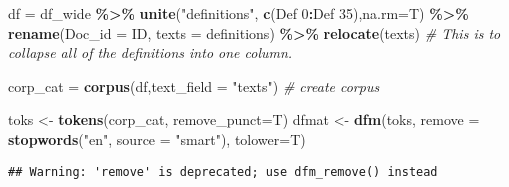 \documentclass[
]{article}
\newenvironment{Shaded}{\begin{snugshade}}{\end{snugshade}}
\newcommand{\AttributeTok}[1]{\textcolor[rgb]{0.13,0.29,0.53}{#1}}
\newcommand{\CommentTok}[1]{\textcolor[rgb]{0.56,0.35,0.01}{\textit{#1}}}
\newcommand{\FunctionTok}[1]{\textcolor[rgb]{0.13,0.29,0.53}{\textbf{#1}}}
\newcommand{\NormalTok}[1]{#1}
\newcommand{\OtherTok}[1]{\textcolor[rgb]{0.56,0.35,0.01}{#1}}
\newcommand{\SpecialCharTok}[1]{\textcolor[rgb]{0.81,0.36,0.00}{\textbf{#1}}}
\newcommand{\StringTok}[1]{\textcolor[rgb]{0.31,0.60,0.02}{#1}}
\begin{document}
\begin{Shaded}
\begin{Highlighting}[]
\NormalTok{df }\OtherTok{=}\NormalTok{ df\_wide }\SpecialCharTok{\%\textgreater{}\%} \FunctionTok{unite}\NormalTok{(}\StringTok{"definitions"}\NormalTok{, }\FunctionTok{c}\NormalTok{(}\StringTok{\textasciigrave{}}\AttributeTok{Def 0}\StringTok{\textasciigrave{}}\SpecialCharTok{:}\StringTok{\textasciigrave{}}\AttributeTok{Def 35}\StringTok{\textasciigrave{}}\NormalTok{),}\AttributeTok{na.rm=}\NormalTok{T) }\SpecialCharTok{\%\textgreater{}\%} 
  \FunctionTok{rename}\NormalTok{(}\AttributeTok{Doc\_id =}\NormalTok{ ID, }\AttributeTok{texts =}\NormalTok{ definitions) }\SpecialCharTok{\%\textgreater{}\%} \FunctionTok{relocate}\NormalTok{(texts) }\CommentTok{\# This is to collapse all of the definitions into one column.}

\NormalTok{corp\_cat }\OtherTok{=} \FunctionTok{corpus}\NormalTok{(df,}\AttributeTok{text\_field =} \StringTok{"texts"}\NormalTok{) }\CommentTok{\# create corpus}

\NormalTok{toks }\OtherTok{\textless{}{-}} \FunctionTok{tokens}\NormalTok{(corp\_cat, }\AttributeTok{remove\_punct=}\NormalTok{T)}
\NormalTok{dfmat }\OtherTok{\textless{}{-}} \FunctionTok{dfm}\NormalTok{(toks, }\AttributeTok{remove =} \FunctionTok{stopwords}\NormalTok{(}\StringTok{"en"}\NormalTok{, }\AttributeTok{source =} \StringTok{"smart"}\NormalTok{), }\AttributeTok{tolower=}\NormalTok{T)}
\end{Highlighting}
\end{Shaded}

\begin{verbatim}
## Warning: 'remove' is deprecated; use dfm_remove() instead
\end{verbatim}
\end{document}
